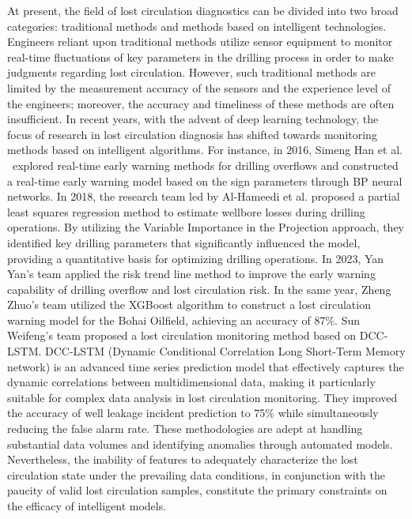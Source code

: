\documentclass[journal,article,submit,pdftex,moreauthors]{Definitions/mdpi}
\begin{document}
At present, the field of lost circulation diagnostics can be divided into two broad categories: traditional methods and methods based on intelligent technologies. Engineers reliant upon traditional methods utilize sensor equipment to monitor real-time fluctuations of key parameters in the drilling process in order to make judgments regarding lost circulation\cite{Saifulizan}. However, such traditional methods are limited by the measurement accuracy of the sensors and the experience level of the engineers; moreover, the accuracy and timeliness of these methods are often insufficient. In recent years, with the advent of deep learning technology, the focus of research in lost circulation diagnosis has shifted towards monitoring methods based on intelligent algorithms. For instance, in 2016, Simeng Han et al.\cite{simeng2016}  explored real-time early warning methods for drilling overflows and constructed a real-time early warning model based on the sign parameters through BP neural networks. In 2018, the research team led by Al-Hameedi et al.\cite{alhameedi} proposed a partial least squares regression method to estimate wellbore losses during drilling operations. By utilizing the Variable Importance in the Projection approach, they identified key drilling parameters that significantly influenced the model, providing a quantitative basis for optimizing drilling operations. In 2023, Yan Yan's team\cite{yandan2023} applied the risk trend line method to improve the early warning capability of drilling overflow and lost circulation risk. In the same year, Zheng Zhuo's team \cite{zhengzhuo2023} utilized the XGBoost algorithm to construct a lost circulation warning model for the Bohai Oilfield, achieving an accuracy of 87\%. Sun Weifeng's team \cite{sunweifeng2023} proposed a lost circulation monitoring method based on DCC-LSTM. DCC-LSTM (Dynamic Conditional Correlation Long Short-Term Memory network) is an advanced time series prediction model that effectively captures the dynamic correlations between multidimensional data, making it particularly suitable for complex data analysis in lost circulation monitoring. They improved the accuracy of well leakage incident prediction to 75\% while simultaneously reducing the false alarm rate. These methodologies are adept at handling substantial data volumes and identifying anomalies through automated models. Nevertheless, the inability of features to adequately characterize the lost circulation state under the prevailing data conditions, in conjunction with the paucity of valid lost circulation samples, constitute the primary constraints on the efficacy of intelligent models\cite{sunweifeng2023}.
\end{document}
